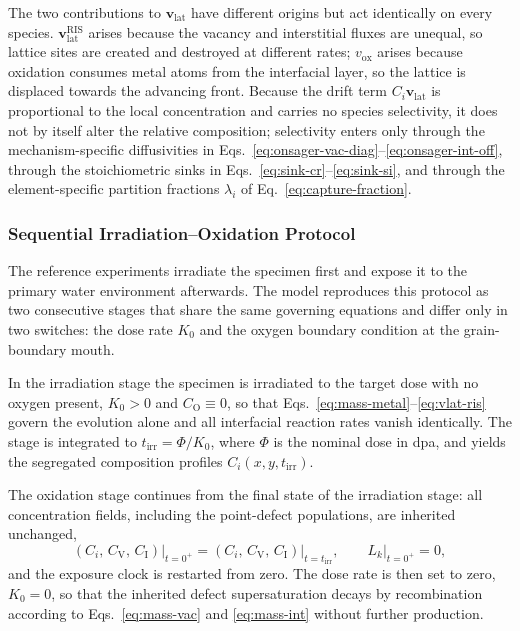 \documentclass[3p,times]{elsarticle} %
\newcommand{\Vac}{\mathrm{V}}          %
\newcommand{\Int}{\mathrm{I}}          %
\newcommand{\lat}{\mathrm{lat}}
\newcommand{\ox}{\mathrm{ox}}
\newcommand{\Ox}{\mathrm{O}}           %
\begin{document}
The two contributions to \(\mathbf{v}_{\lat}\) have different origins but act
identically on every species. \(\mathbf{v}_{\lat}^{\mathrm{RIS}}\) arises because the
vacancy and interstitial fluxes are unequal, so lattice sites are created and destroyed
at different rates; \(v_{\ox}\) arises because oxidation consumes metal atoms from the
interfacial layer, so the lattice is displaced towards the advancing front. Because the
drift term \(C_i\mathbf{v}_{\lat}\) is proportional to the local concentration and
carries no species selectivity, it does not by itself alter the relative composition;
selectivity enters only through the mechanism-specific diffusivities in
Eqs.~\eqref{eq:onsager-vac-diag}--\eqref{eq:onsager-int-off}, through the
stoichiometric sinks in Eqs.~\eqref{eq:sink-cr}--\eqref{eq:sink-si}, and through
the element-specific partition fractions \(\lambda_i\) of
Eq.~\eqref{eq:capture-fraction}.

\subsubsection{Sequential Irradiation--Oxidation Protocol}
\label{sec:methodSequential}



The reference experiments irradiate the specimen first and expose it to the primary
water environment afterwards. The model reproduces this protocol as two consecutive
stages that share the same governing equations and differ only in two switches: the
dose rate \(K_0\) and the oxygen boundary condition at the grain-boundary mouth.

In the irradiation stage the specimen is irradiated to the target dose with no oxygen
present, \(K_0>0\) and \(C_{\Ox}\equiv 0\), so that
Eqs.~\eqref{eq:mass-metal}--\eqref{eq:vlat-ris} govern the evolution alone and all
interfacial reaction rates vanish identically. The stage is integrated to
\(t_{\mathrm{irr}}=\Phi/K_0\), where \(\Phi\) is the nominal dose in dpa, and yields the
segregated composition profiles \(C_i(x,y,t_{\mathrm{irr}})\).

The oxidation stage continues from the final state of the irradiation stage: all
concentration fields, including the point-defect populations, are inherited unchanged,
\begin{equation}
\left.\left(C_i,\,C_{\Vac},\,C_{\Int}\right)\right|_{t=0^{+}}
=\left.\left(C_i,\,C_{\Vac},\,C_{\Int}\right)\right|_{t=t_{\mathrm{irr}}},
\qquad
\left.L_k\right|_{t=0^{+}}=0 ,
\label{eq:handoff}
\end{equation}
and the exposure clock is restarted from zero. The dose rate is then set to zero,
\(K_0=0\), so that the inherited defect supersaturation decays by recombination
according to Eqs.~\eqref{eq:mass-vac} and \eqref{eq:mass-int} without further
production.
\end{document}
